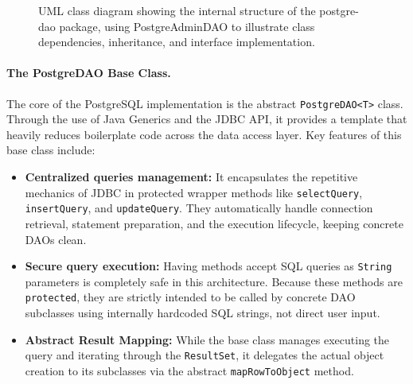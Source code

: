 \begin{figure}[H]
	\caption[UML class diagram of the PostgreDAO (detailed)]{UML class diagram showing the internal structure of the postgre-dao package, using PostgreAdminDAO to illustrate class dependencies, inheritance, and interface implementation.}
\end{figure}

\paragraph{The PostgreDAO Base Class.}
The core of the PostgreSQL implementation is the abstract \texttt{PostgreDAO<T>} class. Through the use of Java Generics and the JDBC API, it provides a template that heavily reduces boilerplate code across the data access layer. Key features of this base class include:

\begin{itemize}
	\item \textbf{Centralized queries management:} It encapsulates the repetitive mechanics of JDBC in protected wrapper methods like \texttt{selectQuery}, \texttt{insertQuery}, and \texttt{updateQuery}. They automatically handle connection retrieval, statement preparation, and the execution lifecycle, keeping concrete DAOs clean.
	\item \textbf{Secure query execution:} Having methods accept SQL queries as \texttt{String} parameters is completely safe in this architecture. Because these methods are \texttt{protected}, they are strictly intended to be called by concrete DAO subclasses using internally hardcoded SQL strings, not direct user input.
	\item \textbf{Abstract Result Mapping:} While the base class manages executing the query and iterating through the \texttt{ResultSet}, it delegates the actual object creation to its subclasses via the abstract \texttt{mapRowToObject} method.
\end{itemize}

